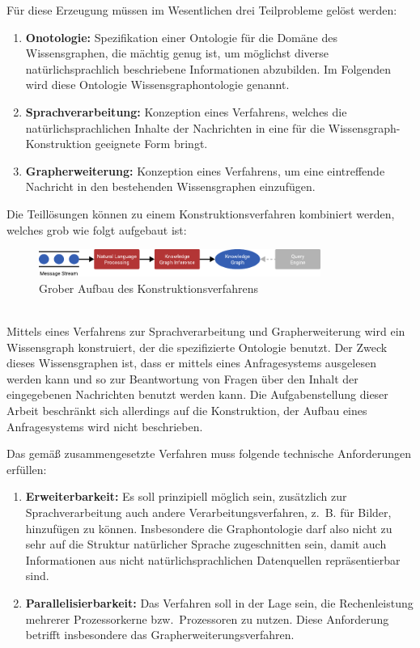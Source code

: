 Für diese Erzeugung müssen im Wesentlichen drei Teilprobleme gelöst werden:
\begin{enumerate}
	\item \textbf{Onotologie:}
		Spezifikation einer Ontologie für die Domäne des Wissensgraphen, die mächtig genug ist, um möglichst diverse natürlichsprachlich beschriebene Informationen abzubilden.
		Im Folgenden wird diese Ontologie Wissensgraph\-ontologie genannt.
	\item \textbf{Sprachverarbeitung:}
		Konzeption eines Verfahrens, welches die natürlichsprachlichen Inhalte der Nachrichten in eine für die Wissensgraph-Konstruktion geeignete Form bringt.
	\item \textbf{Grapherweiterung:}
		Konzeption eines Verfahrens, um eine eintreffende Nachricht in den bestehenden Wissensgraphen einzufügen.
\end{enumerate}
Die Teillösungen können zu einem Konstruktionsverfahren kombiniert werden, welches grob wie folgt aufgebaut ist:
\begin{figure}[h]
	\centering
	\includegraphics[width=0.82\textwidth]{gfx/introduction/overview.pdf}
	\caption{Grober Aufbau des Konstruktionsverfahrens}\label{fig:intro:overview}
\end{figure} \\
Mittels eines Verfahrens zur Sprachverarbeitung und Grapherweiterung wird ein Wissensgraph konstruiert, der die spezifizierte Ontologie benutzt.
Der Zweck dieses Wissensgraphen ist, dass er mittels eines Anfragesystems ausgelesen werden kann und so zur Beantwortung von Fragen über den Inhalt der eingegebenen Nachrichten benutzt werden kann.
Die Aufgabenstellung dieser Arbeit beschränkt sich allerdings auf die Konstruktion, der Aufbau eines Anfragesystems wird nicht beschrieben.

Das gemäß  zusammengesetzte Verfahren muss folgende technische Anforderungen erfüllen:
\begin{enumerate}
	\item \textbf{Erweiterbarkeit:}
		Es soll prinzipiell möglich sein, zusätzlich zur Sprachverarbeitung auch andere Verarbeitungsverfahren, z.~B. für Bilder, hinzufügen zu können.
		Insbesondere die Graphontologie darf also nicht zu sehr auf die Struktur natürlicher Sprache zugeschnitten sein, damit auch Informationen aus nicht natürlichsprachlichen Datenquellen repräsentierbar sind.
	\item \textbf{Parallelisierbarkeit:}
		Das Verfahren soll in der Lage sein, die Rechenleistung mehrerer Prozessorkerne bzw.\ Prozessoren zu nutzen.
		Diese Anforderung betrifft insbesondere das Grapherweiterungsverfahren.
\end{enumerate}


